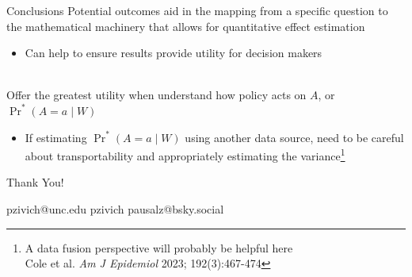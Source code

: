 \documentclass[aspectratio=169]{beamer}
\begin{document}
\begin{frame}{Conclusions}
	Potential outcomes aid in the mapping from a specific question to the mathematical machinery that allows for quantitative effect estimation
	\begin{itemize}
		\item Can help to ensure results provide utility for decision makers
	\end{itemize}
	~\\
	Offer the greatest utility when understand how policy acts on $A$, or ${\Pr}^*(A=a \mid W)$
	\begin{itemize}
		\item If estimating ${\Pr}^*(A=a \mid W)$ using another data source, need to be careful about transportability and appropriately estimating the variance\footnote[frame]{A data fusion perspective will probably be helpful here \\ Cole et al. \textit{Am J Epidemiol} 2023; 192(3):467-474}
	\end{itemize}
\end{frame}

\begin{frame}{Thank You!}
	\begin{center}
		\small
		\faEnvelope \quad pzivich@unc.edu \qquad \quad 
		\faGithub \quad pzivich \qquad \quad
		\faHashtag \quad pausalz@bsky.social
	\end{center}	
\end{frame}
\end{document}
